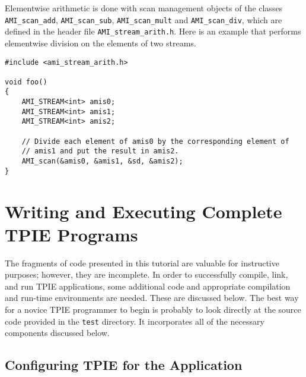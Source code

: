Elementwise arithmetic is done with scan management objects
 of the classes
\verb|AMI_scan_add|, \verb|AMI_scan_sub|, \verb|AMI_scan_mult| and
\verb|AMI_scan_div|, which are defined in the header file
\verb|AMI_stream_arith.h|.  Here is an example that performs
elementwise division on the elements of two streams.

\begin{verbatim}
#include <ami_stream_arith.h>

void foo()
{
    AMI_STREAM<int> amis0;
    AMI_STREAM<int> amis1;
    AMI_STREAM<int> amis2;

    // Divide each element of amis0 by the corresponding element of
    // amis1 and put the result in amis2.
    AMI_scan(&amis0, &amis1, &sd, &amis2);
}
\end{verbatim}


\section{Writing and Executing Complete TPIE Programs}
\label{sec:complete}

The fragments of code presented in this tutorial are valuable for
instructive purposes; however, they are incomplete.  In order to
successfully compile, link, and run TPIE applications, some additional
code and appropriate compilation and run-time environments are needed.
These are discussed below.  The best way for a novice TPIE programmer
to begin is probably to look directly at the source code provided in
the {\tt test} directory.  It incorporates all of the necessary
components discussed below.

\subsection{Configuring TPIE for the Application}
\label{sec:macros}

